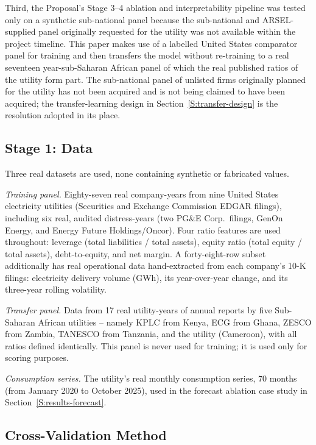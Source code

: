 \documentclass[final,1p,times]{elsarticle}
\begin{document}
Third, the Proposal's Stage 3--4 ablation and interpretability pipeline was tested only on a synthetic sub-national panel because the sub-national and ARSEL-supplied panel originally requested for the utility was not available within the project timeline. This paper makes use of a labelled United States comparator panel for training and then transfers the model without re-training to a real seventeen year-sub-Saharan African panel of which the real published ratios of the utility form part. The sub-national panel of unlisted firms originally planned for the utility has not been acquired and is not being claimed to have been acquired; the transfer-learning design in Section~\ref{S:transfer-design} is the resolution adopted in its place.

\subsection{Stage 1: Data}
\label{S:data}

Three real datasets are used, none containing synthetic or fabricated values.

\emph{Training panel.} Eighty-seven real company-years from nine United States electricity utilities (Securities and Exchange Commission EDGAR filings), including six real, audited distress-years (two PG\&E Corp.\ filings, GenOn Energy, and Energy Future Holdings/Oncor). Four ratio features are used throughout: leverage (total liabilities / total assets), equity ratio (total equity / total assets), debt-to-equity, and net margin. A forty-eight-row subset additionally has real operational data hand-extracted from each company's 10-K filings: electricity delivery volume (GWh), its year-over-year change, and its three-year rolling volatility.

\emph{Transfer panel.} Data from 17 real utility-years of annual reports by five Sub-Saharan African utilities -- namely KPLC from Kenya, ECG from Ghana, ZESCO from Zambia, TANESCO from Tanzania, and the utility (Cameroon), with all ratios defined identically. This panel is never used for training; it is used only for scoring purposes.

\emph{Consumption series.} The utility's real monthly consumption series, 70 months (from January 2020 to October 2025), used in the forecast ablation case study in Section~\ref{S:results-forecast}.

\subsection{Cross-Validation Method}
\label{S:cv}
\end{document}
